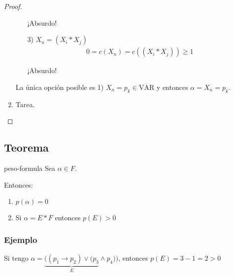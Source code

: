 \begin{proof}
\begin{enumerate}
\begin{enumerate}
                    ¡Absurdo!

                \item[3)] $X_n = (X_i * X_j)$ %
                    \begin{gather*}
                        0 = c(X_n) = c((X_i * X_j)) \geq 1
                    \end{gather*}

                    ¡Absurdo!
            \end{enumerate}

            La única opción posible es 1) $X_n = p_k \in \mathrm{VAR}$ y
            entonces $\alpha = X_n = p_k$.

        \item Tarea.
    \end{enumerate}
\end{proof}

\subsection{Teorema}

\begin{teorema}{}{peso-formula}
    Sea $\alpha \in F$.

    \medskip

    Entonces:
    \begin{enumerate}
        \item $p(\alpha)= 0$
        \item Si $\alpha = E * F$ entonces $p(E)>0$
            \nota{$* \in \{ \wedge, \vee, \to \}$}%
    \end{enumerate}
\end{teorema}

\subsubsection{Ejemplo}

Si tengo $\alpha = \underbrace{((p_1 \to p_2) \vee (p_3}_{E} \wedge p_4))$, 
entonces $p(E) = 3-1 = 2>0$



